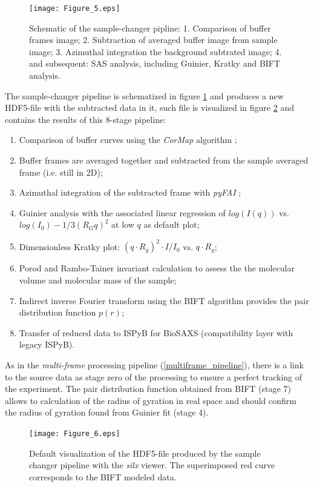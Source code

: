 \documentclass[preprint]{iucr}              %
\begin{document}
\begin{figure}
\label{samplechanger_worflow}
\texttt{[image: Figure\_5.eps]}
\caption{Schematic of the sample-changer pipline: 
1. Comparison of buffer frames image;
2. Subtraction of averaged buffer image from sample image;
3. Azimuthal integration the background subtrated image;
4. and subsequent: SAS analysis, including Guinier, Kratky and BIFT analysis.}
\end{figure}

The sample-changer pipeline is schematized in figure \ref{samplechanger_worflow} and produces a new HDF5-file with the subtracted data in it, such file is visualized in figure \ref{subtracted} and contains the results of this 8-stage pipeline: 
\begin{enumerate}
    \item Comparison of buffer curves using the \textit{CorMap} algorithm \cite{CorMap};
    \item Buffer frames are averaged together and subtracted from the sample averaged frame (i.e. still in 2D);
    \item Azimuthal integration of the subtracted frame with \textit{pyFAI} \cite{pyfai_2020};
    \item Guinier analysis with the associated linear regression of $log(I(q))$ vs. $log(I_0)-1/3 (R_{G}q)^{2}$ at low $q$ as default plot;
    \item Dimensionless Kratky plot: $(q\cdot R_g)^2\cdot I/I_0$  vs. $q\cdot R_g$;
    \item Porod \cite{glatter+kratky} and Rambo-Tainer invariant \cite{RamboTainerNature2013} calculation to assess the the molecular volume and molecular mass of the sample;
    \item Indirect inverse Fourier transform using the BIFT algorithm \cite{bift} provides the pair distribution function $p(r)$;
    \item Transfer of reduced data to ISPyB for BioSAXS (compatibility layer with legacy ISPyB).
\end{enumerate}
As in the \textit{multi-frame} processing pipeline (\ref{multiframe_pipeline}), there is a link to the source data as stage zero of the processing to ensure a perfect tracking of the experiment.
The pair distribution function obtained from BIFT (stage 7) allows to calculation of the radius of gyration in real space and should confirm the radius of gyration found from Guinier fit (stage 4). 

\begin{figure}
\label{subtracted}
\texttt{[image: Figure\_6.eps]}
\caption{Default visualization of the HDF5-file produced by the sample changer pipeline with the \textit{silx} viewer. 
The superimposed red curve corresponds to the BIFT modeled data.}
\end{figure}
\end{document}

